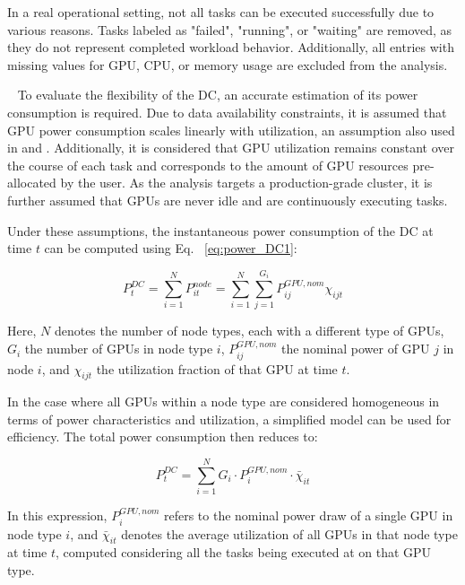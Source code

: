\documentclass[preprint,12pt]{elsarticle}
\begin{document}
In a real operational setting, not all tasks can be executed successfully due to various reasons.  Tasks labeled as "failed", "running", or "waiting" are removed, as they do not represent completed workload behavior. Additionally, all entries with missing values for GPU, CPU, or memory usage are excluded from the analysis. 


\
To evaluate the flexibility of the DC, an accurate estimation of its power consumption is required. Due to data availability constraints, it is assumed that GPU power consumption scales linearly with utilization, an assumption also used in \cite{Wang2024} and \cite{Shehabi2024}. Additionally, it is considered that GPU utilization remains constant over the course of each task and corresponds to the amount of GPU resources pre-allocated by the user. As the analysis targets a production-grade cluster, it is further assumed that GPUs are never idle and are continuously executing tasks.

Under these assumptions, the instantaneous power consumption of the DC at time $t$ can be computed using Eq. ~\ref{eq:power_DC1}:

\begin{equation} \label{eq:power_DC1}
P^{DC}_{t} = \sum_{i=1}^{N} P^{node}_{it} = \sum_{i=1}^{N} \sum_{j=1}^{G_i} P^{GPU, nom}_{ij} \chi_{ijt}
\end{equation}

Here, $N$ denotes the number of node types, each with a different type of GPUs, $G_i$ the number of GPUs in node type $i$, $P^{GPU, nom}_{ij}$ the nominal power of GPU $j$ in node $i$, and $\chi_{ijt}$ the utilization fraction of that GPU at time $t$. 

In the case where all GPUs within a node type are considered homogeneous in terms of power characteristics and utilization, a simplified model can be used for efficiency. The total power consumption then reduces to:

\begin{equation} \label{eq:power_DC2}
P^{DC}_t = \sum_{i=1}^{N} G_i \cdot P^{GPU, nom}_i \cdot \bar{\chi}_{it}
\end{equation}

In this expression, $P^{GPU, nom}_i$ refers to the nominal power draw of a single GPU in node type $i$, and $\bar{\chi}_{it}$ denotes the average utilization of all GPUs in that node type at time $t$, computed considering all the tasks being executed at on that GPU type.
\end{document}

